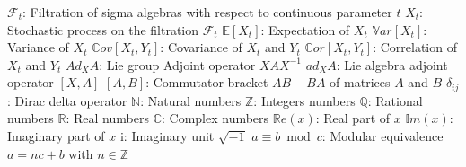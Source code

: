 \begin{tabbing}
	\addsymbol \mbox{$\mathscr{F}_t$}: {Filtration of sigma algebras with respect to continuous parameter $t$}
	\addsymbol \mbox{$X_t$}: {Stochastic process on the filtration $\mathscr{F}_t$}
	\addsymbol \mbox{$\mathbb{E}\left[X_t\right]$}: {Expectation of $X_t$}
	\addsymbol \mbox{$\mathbb{V}ar\left[X_t\right]$}: {Variance of $X_t$}
	\addsymbol \mbox{$\mathbb{C}ov\left[X_t, Y_t\right]$}: {Covariance of $X_t$ and $Y_t$}
	\addsymbol \mbox{$\mathbb{C}or\left[X_t, Y_t\right]$}: {Correlation of $X_t$ and $Y_t$}
	\addsymbol \mbox{$Ad_X A$}: {Lie group Adjoint operator $XAX^{-1}$}
	\addsymbol \mbox{$ad_X A$}: {Lie algebra adjoint operator $\left[X,A\right]$}
	\addsymbol \mbox{$\left[A,B\right]$}: {Commutator bracket $AB - BA$ of matrices $A$ and $B$}
	\addsymbol \mbox{$\delta_{ij}$}: {Dirac delta operator}
	\addsymbol \mbox{$\mathbb{N}$}: {Natural numbers}
	\addsymbol \mbox{$\mathbb{Z}$}: {Integers numbers}
	\addsymbol \mbox{$\mathbb{Q}$}: {Rational numbers}
	\addsymbol \mbox{$\mathbb{R}$}: {Real numbers}
	\addsymbol \mbox{$\mathbb{C}$}: {Complex numbers}
	\addsymbol \mbox{$\mathbb{R}e\left(x\right)$}: {Real part of $x$}
	\addsymbol \mbox{$\mathbb{I}m\left(x\right)$}: {Imaginary part of $x$}
	\addsymbol \mbox{$\mathrm{i}$}: {Imaginary unit $\sqrt{-1}$}
	\addsymbol \mbox{$a \equiv b \bmod c$}: {Modular equivalence $a = nc + b$ with $n \in \mathbb{Z}$}
\end{tabbing}